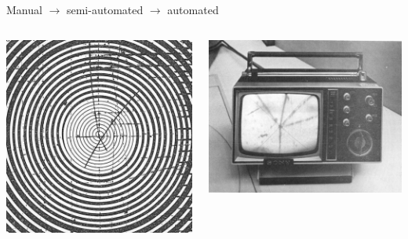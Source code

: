 \documentclass[aspectratio=169]{beamer}
\begin{document}
\begin{frame}{Manual $\to$ semi-automated $\to$ automated}
\begin{columns}
\includegraphics[width=\linewidth]{PLOTS/spiral-reader-1.jpg}

\includegraphics[width=\linewidth]{PLOTS/spiral-reader-2.jpg}

\end{columns}
\end{frame}
\end{document}
